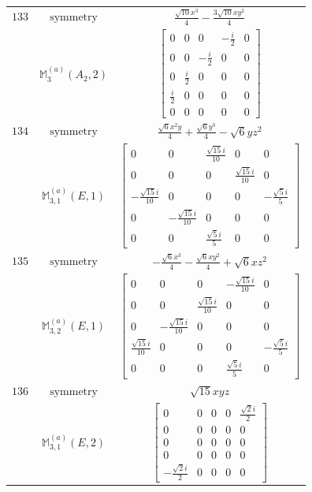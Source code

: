 \documentclass[fleqn,8pt,landscape]{jsarticle}
\begin{document}
\begin{longtable}{ccc}
$ 133 $ & $ \text{symmetry} $ & $ \frac{\sqrt{10} x^{3}}{4} - \frac{3 \sqrt{10} x y^{2}}{4} $ \\
$  $ & $ \mathbb{M}_{3}^{(a)}(A_{2},2) $ & $ \begin{bmatrix} 0 & 0 & 0 & - \frac{i}{2} & 0 \\ 0 & 0 & - \frac{i}{2} & 0 & 0 \\ 0 & \frac{i}{2} & 0 & 0 & 0 \\ \frac{i}{2} & 0 & 0 & 0 & 0 \\ 0 & 0 & 0 & 0 & 0 \end{bmatrix} $ \\ \hline
$ 134 $ & $ \text{symmetry} $ & $ \frac{\sqrt{6} x^{2} y}{4} + \frac{\sqrt{6} y^{3}}{4} - \sqrt{6} y z^{2} $ \\
$  $ & $ \mathbb{M}_{3,1}^{(a)}(E,1) $ & $ \begin{bmatrix} 0 & 0 & \frac{\sqrt{15} i}{10} & 0 & 0 \\ 0 & 0 & 0 & \frac{\sqrt{15} i}{10} & 0 \\ - \frac{\sqrt{15} i}{10} & 0 & 0 & 0 & - \frac{\sqrt{5} i}{5} \\ 0 & - \frac{\sqrt{15} i}{10} & 0 & 0 & 0 \\ 0 & 0 & \frac{\sqrt{5} i}{5} & 0 & 0 \end{bmatrix} $ \\ \hline
$ 135 $ & $ \text{symmetry} $ & $ - \frac{\sqrt{6} x^{3}}{4} - \frac{\sqrt{6} x y^{2}}{4} + \sqrt{6} x z^{2} $ \\
$  $ & $ \mathbb{M}_{3,2}^{(a)}(E,1) $ & $ \begin{bmatrix} 0 & 0 & 0 & - \frac{\sqrt{15} i}{10} & 0 \\ 0 & 0 & \frac{\sqrt{15} i}{10} & 0 & 0 \\ 0 & - \frac{\sqrt{15} i}{10} & 0 & 0 & 0 \\ \frac{\sqrt{15} i}{10} & 0 & 0 & 0 & - \frac{\sqrt{5} i}{5} \\ 0 & 0 & 0 & \frac{\sqrt{5} i}{5} & 0 \end{bmatrix} $ \\ \hline
$ 136 $ & $ \text{symmetry} $ & $ \sqrt{15} x y z $ \\
$  $ & $ \mathbb{M}_{3,1}^{(a)}(E,2) $ & $ \begin{bmatrix} 0 & 0 & 0 & 0 & \frac{\sqrt{2} i}{2} \\ 0 & 0 & 0 & 0 & 0 \\ 0 & 0 & 0 & 0 & 0 \\ 0 & 0 & 0 & 0 & 0 \\ - \frac{\sqrt{2} i}{2} & 0 & 0 & 0 & 0 \end{bmatrix} $ \\ \hline

\end{longtable}
\end{document}
